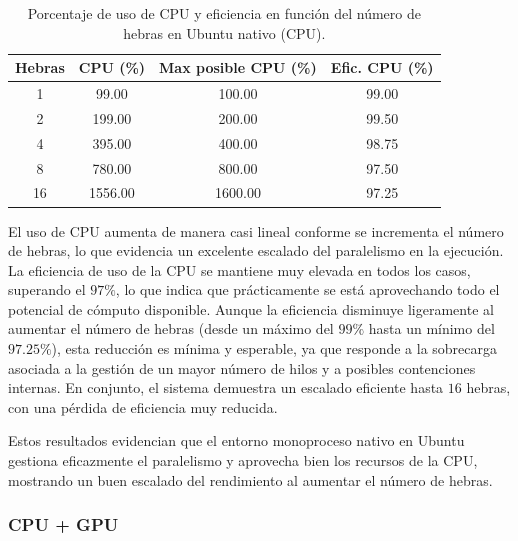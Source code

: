 \begin{table}[ht]
    \centering
    \begin{tabular}{|c|c|c|c|}
        \hline
        \textbf{Hebras} & \textbf{CPU (\%)} & \textbf{Max posible CPU (\%)} & \textbf{Efic. CPU (\%)} \\
        \hline
        1               & 99.00             & 100.00                        & 99.00                   \\
        2               & 199.00            & 200.00                        & 99.50                   \\
        4               & 395.00            & 400.00                        & 98.75                   \\
        8               & 780.00            & 800.00                        & 97.50                   \\
        16              & 1556.00           & 1600.00                       & 97.25                   \\
        \hline
    \end{tabular}
    \caption{Porcentaje de uso de CPU y eficiencia en función del número de hebras en Ubuntu nativo (CPU).}
    \label{tab:single-node_ubuntu_cpu_native_cpu}
\end{table}

El uso de CPU aumenta de manera casi lineal conforme se incrementa el número de hebras, lo que evidencia un excelente escalado del paralelismo en la ejecución. La eficiencia de uso de la CPU se mantiene muy elevada en todos los casos, superando el $97\%$, lo que indica que prácticamente se está aprovechando todo el potencial de cómputo disponible. Aunque la eficiencia disminuye ligeramente al aumentar el número de hebras (desde un máximo del $99\%$ hasta un mínimo del $97.25\%$), esta reducción es mínima y esperable, ya que responde a la sobrecarga asociada a la gestión de un mayor número de hilos y a posibles contenciones internas. En conjunto, el sistema demuestra un escalado eficiente hasta $16$ hebras, con una pérdida de eficiencia muy reducida.

Estos resultados evidencian que el entorno monoproceso nativo en Ubuntu gestiona eficazmente el paralelismo y aprovecha bien los recursos de la CPU, mostrando un buen escalado del rendimiento al aumentar el número de hebras.

\subsubsection{CPU + GPU}

